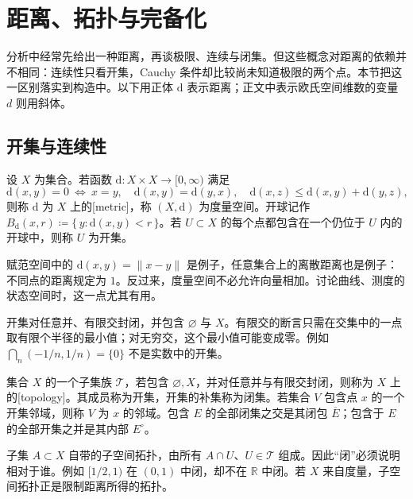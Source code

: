 \section{距离、拓扑与完备化}
\label{b1:sec:A101}

分析中经常先给出一种距离，再谈极限、连续与闭集。但这些概念对距离的依赖并不相同：连续性只看开集，Cauchy 条件却比较尚未知道极限的两个点。本节把这一区别落实到构造中。以下用正体 \(\mathrm{d}\) 表示距离；正文中表示欧氏空间维数的变量 \(d\) 则用斜体。

\subsection{开集与连续性}
\label{b1:subsec:A10101}

\begin{definition}\label{b1:def:app-metric}
设 \(X\) 为集合。若函数 \(\mathrm{d}:X\times X\rightarrow[0,\infty)\) 满足
\[
 \mathrm{d}(x,y)=0\ \Longleftrightarrow\ x=y,\quad
 \mathrm{d}(x,y)=\mathrm{d}(y,x),\quad \mathrm{d}(x,z)\le \mathrm{d}(x,y)+\mathrm{d}(y,z),
\]
则称 \(\mathrm{d}\) 为 \(X\) 上的[metric]，称 \((X,\mathrm{d})\) 为度量空间。开球记作 \(B_{\mathrm{d}}(x,r)\coloneqq\{\,y:\mathrm{d}(x,y)<r\,\}\)。若 \(U\subset X\) 的每个点都包含在一个仍位于 \(U\) 内的开球中，则称 \(U\) 为开集。
\end{definition}

赋范空间中的 \(\mathrm{d}(x,y)=\|x-y\|\) 是例子，任意集合上的离散距离也是例子：不同点的距离规定为 \(1\)。反过来，度量空间不必允许向量相加。讨论曲线、测度的状态空间时，这一点尤其有用。

\ProseParagraphBreak

开集对任意并、有限交封闭，并包含 \(\varnothing\) 与 \(X\)。有限交的断言只需在交集中的一点取有限个半径的最小值；对无穷交，这个最小值可能变成零。例如 \(\bigcap_n(-1/n,1/n)=\{0\}\) 不是实数中的开集。

\begin{definition}\label{b1:def:app-topology}
集合 \(X\) 的一个子集族 \(\mathcal T\)，若包含 \(\varnothing,X\)，并对任意并与有限交封闭，则称为 \(X\) 上的[topology]。其成员称为开集，开集的补集称为闭集。若集合 \(V\) 包含点 \(x\) 的一个开集邻域，则称 \(V\) 为 \(x\) 的邻域。包含 \(E\) 的全部闭集之交是其闭包 \(\overline E\)；包含于 \(E\) 的全部开集之并是其内部 \(E^\circ\)。
\end{definition}

子集 \(A\subset X\) 自带的子空间拓扑，由所有 \(A\cap U\)、\(U\in\mathcal T\) 组成。因此“闭”必须说明相对于谁。例如 \([1/2,1)\) 在 \((0,1)\) 中闭，却不在 \(\mathbb R\) 中闭。若 \(X\) 来自度量，子空间拓扑正是限制距离所得的拓扑。

